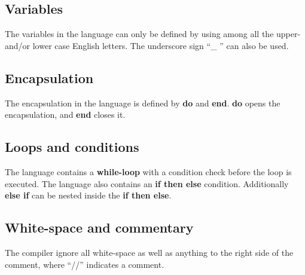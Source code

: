 \subsection{Variables}
The variables in the language can only be defined by using among all the upper- and/or lower case English letters. The underscore sign ``\_ '' can also be used. 

\subsection{Encapsulation}
The encapsulation in the language is defined by \textbf{do} and \textbf{end}. \textbf{do} opens the encapsulation, and \textbf{end} closes it.   

\subsection{Loops and conditions}
The language contains a \textbf{while-loop} with a condition check before the loop is executed. The language also contains an \textbf{if then else} condition. Additionally \textbf{else if} can be nested inside the \textbf{if then else}.   

\subsection{White-space and commentary}
The compiler ignore all white-space as well as anything to the right side of the comment, where ``//'' indicates a comment.


